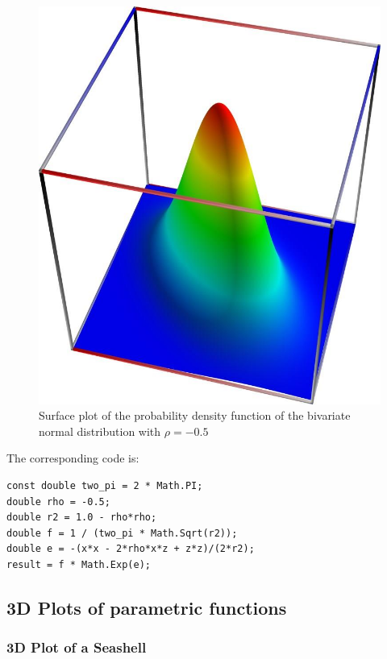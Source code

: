 \begin{figure}[ht]
	\centering
	\includegraphics[scale=3.0]{Charts/jpg/BivariateNormal2.jpg}
	\caption{Surface plot of the probability density function of the bivariate normal distribution with $\rho = - 0.5$ }
	\label{Fig plot of the bivariate normal distribution}
\end{figure}


The corresponding code is:
\begin{lstlisting}
const double two_pi = 2 * Math.PI;
double rho = -0.5;
double r2 = 1.0 - rho*rho;
double f = 1 / (two_pi * Math.Sqrt(r2));
double e = -(x*x - 2*rho*x*z + z*z)/(2*r2);
result = f * Math.Exp(e);
\end{lstlisting}


\newpage
\subsection{3D Plots of parametric functions}

\subsubsection{3D Plot of a Seashell}

